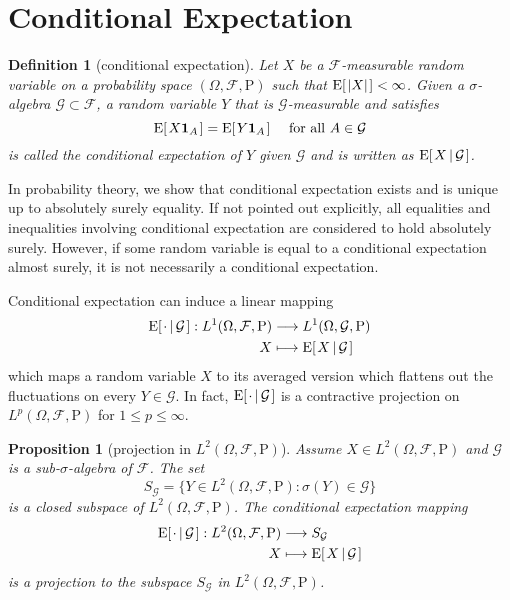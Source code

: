 \documentclass{report}
\newcommand\expt[1]{\mathrm{E}\mleft[\hspace{1pt}#1\hspace{1pt}\mright]}
\newcommand\coex[2]{\mathrm{E}\mleft[\hspace{1pt}#1\,\middle|\, #2\hspace{1pt}\mright]}
\newtheorem{definition}{Definition}[section]
\newtheorem{proposition}{Proposition}[section]
\theoremstyle{nonumberplain}
\begin{document}
\section{Conditional Expectation}
\begin{definition}[conditional expectation]
	Let $X$ be a $\mathcal{F}$-measurable random variable on a probability space $(\Omega,\mathcal{F},\mathrm{P})$ such that $\expt{\left|X\right|} < \infty$. Given a $\sigma$-algebra $\mathcal{G}\subset\mathcal{F}$, a random variable $Y$ that is $\mathcal{G}$-measurable and satisfies 
	\[
	\expt{X\mathbf{1}_A} = \expt{Y\mathbf{1}_A} \quad\text{ for all }A \in \mathcal{G}
	\] 
	is called the \emph{conditional expectation} of $Y$ given $\mathcal{G}$ and is written as $\coex{X}{\mathcal{G}}$.
\end{definition}
In probability theory, we show that conditional expectation exists and is unique up to absolutely surely equality. If not pointed out explicitly, all equalities and inequalities involving conditional expectation are considered to hold absolutely surely. However, if some random variable is equal to a conditional expectation almost surely, it is not necessarily a conditional expectation.

Conditional expectation can induce a linear mapping
\begin{align*}
\coex{\cdot}{\mathcal{G}}:L^1(\Omega,\mathcal{F},\mathrm{P})&\longrightarrow L^1(\Omega,\mathcal{G},\mathrm{P})\\
X&\longmapsto \coex{X}{\mathcal{G}}
\end{align*}
which maps a random variable $X$ to its averaged version which flattens out the fluctuations on every $Y\in \mathcal{G}$.
In fact, $\coex{\cdot}{\mathcal{G}}$ is a contractive projection on $L^p(\Omega,\mathcal{F},\mathrm{P})$ for $1\leq p\leq \infty$. 

\begin{proposition}[projection in $L^2(\Omega,\mathcal{F},\mathrm{P})$]
	Assume $X\in L^2(\Omega,\mathcal{F},\mathrm{P})$ and $\mathcal{G}$ is a sub-$\sigma$-algebra of $\mathcal{F}$. The set
	\[
	S_\mathcal{G}=\{Y\in L^2(\Omega,\mathcal{F},\mathrm{P}):\sigma(Y)\in \mathcal{G}\}
	\]
	is a closed subspace of $L^2(\Omega,\mathcal{F},\mathrm{P})$.
	The conditional expectation mapping
	\begin{align*}
	\coex{\cdot}{\mathcal{G}}:L^2(\Omega,\mathcal{F},\mathrm{P})&\longrightarrow S_\mathcal{G}\\
	X&\longmapsto \coex{X}{\mathcal{G}}
	\end{align*}
	is a projection to the subspace $S_\mathcal{G}$ in $L^2(\Omega,\mathcal{F},\mathrm{P})$.
\end{proposition}
\end{document}
